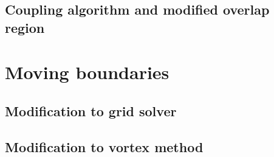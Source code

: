 \subsection{Coupling algorithm and modified overlap region}


\section{Moving boundaries}
\subsection{Modification to grid solver}
\subsection{Modification to vortex method}


%



